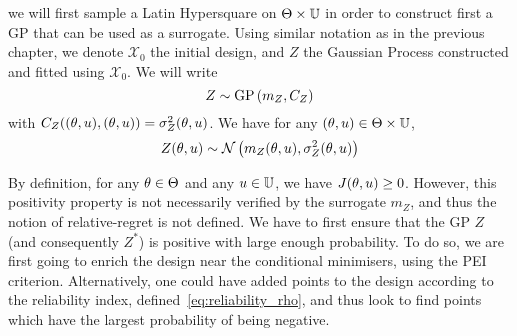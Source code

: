 \documentclass[../../Main_ManuscritThese.tex]{subfiles}
\begin{document}
 we will first sample a Latin Hypersquare on
$\Theta \times \mathbb{U}$ in order to construct first a GP that can be
used as a surrogate. Using similar notation as in the previous
chapter, we denote $\mathcal{X}_0$ the initial design, and $Z$ the
Gaussian Process constructed and fitted using
$\mathcal{X}_0$.
We will write
\begin{equation}
  Z \sim \operatorname{\mathrm{GP}}\left(m_Z, C_Z\right)
\end{equation}
with $C_Z((\theta, u),(\theta, u)) = \sigma^2_Z(\theta, u)$. We have for
any $(\theta, u) \in \Theta\times\mathbb{U}$,
\begin{equation}
  Z(\theta, u) \sim \mathcal{N}\left(m_Z(\theta, u), \sigma^2_Z(\theta, u)\right)
\end{equation}


By definition, for any $\theta\in \Theta$ and any $u \in \mathbb{U}$, we
have $J(\theta, u) \geq 0$.  However, this positivity property is not
necessarily verified by the surrogate $m_Z$, and thus the notion of
relative-regret is not defined. We have to first ensure that the GP
$Z$ (and consequently $Z^*$) is positive with large enough
probability.  To do so, we are first going to enrich the design near
the conditional minimisers, using the PEI criterion.  Alternatively,
one could have added points to the design according to the reliability
index, defined~\cref{eq:reliability_rho}, and thus look to find points
which have the largest probability of being negative.
\end{document}
